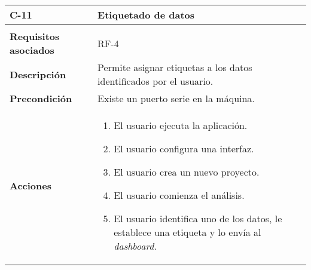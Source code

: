 \begin{longtable}[H]{@{}ll@{}}
\toprule
\begin{minipage}[b]{0.23\columnwidth}\raggedright\strut
\textbf{C-11}\strut
\end{minipage} & \begin{minipage}[b]{0.71\columnwidth}\raggedright\strut
\textbf{Etiquetado de datos}\strut
\end{minipage}\tabularnewline
\midrule
\endhead
\tabularnewline
\begin{minipage}[t]{0.23\columnwidth}\raggedright\strut
\textbf{Requisitos asociados}\strut
\end{minipage} & \begin{minipage}[t]{0.71\columnwidth}\raggedright\strut
RF-4\strut
\end{minipage}\tabularnewline
\begin{minipage}[t]{0.23\columnwidth}\raggedright\strut
\textbf{Descripción}\strut
\end{minipage} & \begin{minipage}[t]{0.71\columnwidth}\raggedright\strut
Permite asignar etiquetas a los datos identificados por el usuario.\strut
\end{minipage}\tabularnewline
\begin{minipage}[t]{0.23\columnwidth}\raggedright\strut
\textbf{Precondición}\strut
\end{minipage} & \begin{minipage}[t]{0.71\columnwidth}\raggedright\strut
Existe un puerto serie en la máquina.
\strut
\end{minipage}\tabularnewline
\begin{minipage}[t]{0.23\columnwidth}\raggedright\strut
\textbf{Acciones}\strut
\end{minipage} & \begin{minipage}[t]{0.71\columnwidth}\raggedright\strut
\begin{enumerate}
\def\labelenumi{\arabic{enumi}.}
\item
El usuario ejecuta la aplicación.
\item
El usuario configura una interfaz.
\item
El usuario crea un nuevo proyecto.
\item
El usuario comienza el análisis.
\item
El usuario identifica uno de los datos, le establece una etiqueta y lo envía al \emph{dashboard}.
\end{enumerate}\strut
\end{minipage}\tabularnewline

\end{longtable}
